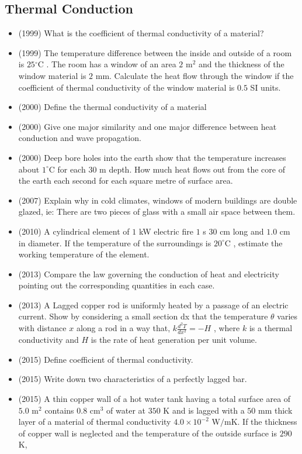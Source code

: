 \documentclass{article}
\begin{document}
\subsection{Thermal Conduction}
\begin{itemize}
\item (1999)  What is the coefficient of thermal conductivity of a material?
\item (1999)  The temperature difference between the inside and outside of a room is $ 25​^{\circ}$C . The room has a window of an area $ 2$ m$ ​^{2}$ and the thickness of the window material is $ 2$ mm. Calculate the heat flow through the window if the coefficient of thermal conductivity of the window material is $ 0.5$ SI units.
\item (2000)  Define the thermal conductivity of a material
\item (2000)  Give one major similarity and one major difference between heat conduction and wave propagation.
\item (2000)  Deep bore holes into the earth show that the temperature increases about $ 1^{\circ}$C for each $ 30$ m depth. How much heat flows out from the core of the earth each second for each square metre of surface area.
\item (2007)  Explain why in cold climates, windows of modern buildings are double glazed, ie: There are two pieces of glass with a small air space between them.
\item (2010)  A cylindrical element of $ 1$ kW electric fire $ 1$ s $ 30$ cm long and $ 1.0$ cm in  diameter. If the temperature of the surroundings is $ 20^{\circ}$C , estimate the working temperature of the element.
\item (2013)  Compare the law governing the conduction of heat and electricity pointing out the corresponding quantities in each case.
\item (2013)  A Lagged copper rod is uniformly heated by a passage of an electric current. Show by considering a small section dx that the temperature $ \theta $ varies with distance $ x$ along a rod in a way that, $ k\frac{d^{2}T}{dx^{2}}=-H$ , where $ k$ is a thermal conductivity and $ H$ is the rate of heat generation per unit volume.
\item (2015)  Define coefficient of thermal conductivity.
\item (2015)  Write down two characteristics of a perfectly lagged bar.
\item (2015)  A thin copper wall of a hot water tank having a total surface area of $ 5.0$ m$ ^{2}$ contains $ 0.8$ cm$ ^{3}$ of water at $ 350$ K and is lagged with a $ 50$ mm thick layer of a material of thermal conductivity $ 4.0\times10^{-2}$ W$/$mK. If the thickness of copper wall is neglected and the temperature of the outside surface is $ 290$ K,

\end{itemize}
\end{document}
